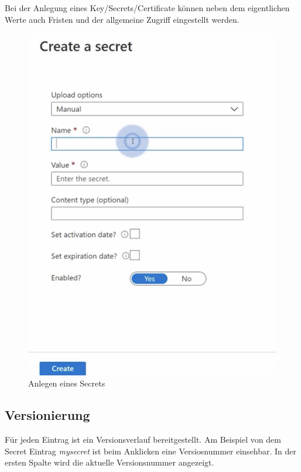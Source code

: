 Bei der Anlegung eines Key/Secrets/Certificate können neben dem eigentlichen Werte auch Fristen und der allgemeine Zugriff eingestellt werden.
\begin{figure}[H]
	\centering
	\includegraphics[scale = 0.2]{attachment/chapter_2/Scc133}
	\caption{Anlegen eines Secrets}
\end{figure}

\subsection{Versionierung}
Für jeden Eintrag ist ein Versionsverlauf bereitgestellt. Am Beispiel von dem Secret Eintrag \textit{mysecret} ist beim Anklicken eine Versiosnummer einsehbar. In der ersten Spalte wird die aktuelle Versionsnummer angezeigt.

